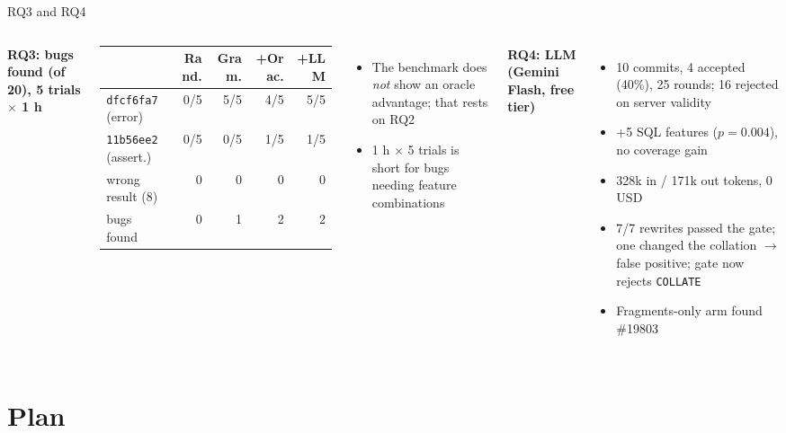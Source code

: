 \documentclass[aspectratio=169,11pt]{beamer}
\begin{document}
\begin{frame}{RQ3 and RQ4}
\begin{columns}[T]
\textbf{RQ3: bugs found (of 20), 5 trials $\times$ 1 h}
\tiny\setlength{\tabcolsep}{2pt}
\begin{tabular}{lrrrr}
\toprule
 & Rand. & Gram. & +Orac. & +LLM \\
\midrule
\texttt{dfcf6fa7} (error) & 0/5 & 5/5 & 4/5 & 5/5 \\
\texttt{11b56ee2} (assert.) & 0/5 & 0/5 & 1/5 & 1/5 \\
wrong result (8) & 0 & 0 & 0 & 0 \\
\midrule
bugs found & 0 & 1 & 2 & 2 \\
\bottomrule
\end{tabular}

\scriptsize
\begin{itemize}
  \item The benchmark does \emph{not} show an oracle advantage; that rests on RQ2
  \item 1 h $\times$ 5 trials is short for bugs needing feature combinations
\end{itemize}
\textbf{RQ4: LLM (Gemini Flash, free tier)}
\small
\begin{itemize}
  \item 10 commits, 4 accepted (40\%), 25 rounds; 16 rejected on server validity
  \item +5 SQL features ($p=0.004$), \alert{no} coverage gain
  \item 328k in / 171k out tokens, 0 USD
  \item 7/7 rewrites passed the gate; one changed the collation $\rightarrow$ false positive; gate now rejects \texttt{COLLATE}
  \item Fragments-only arm found \#19803
\end{itemize}
\end{columns}
\end{frame}

\section{Plan}
\end{document}
